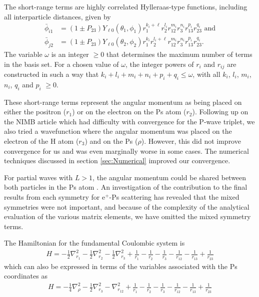 \documentclass[preprint,showpacs,preprintnumbers,amsmath,amssymb]{revtex4}
\begin{document}
The short-range terms are highly correlated Hylleraas-type functions, including all interparticle distances, given by
\begin{subequations}
\label{eq:PhiDef}
\begin{align}
\bar{\phi}_{i1} &= \left(1 \pm P_{23}\right) Y_{\ell 0}(\theta_1,\phi_1) r_1^{k_i + \ell} r_2^{l_i} r_{12}^{m_i} r_3^{n_i} r_{13}^{p_i} r_{23}^{q_i} \text{ and} \label{eq:PartialWavePhi1i}\\
\bar{\phi}_{j2} &= \left(1 \pm P_{23}\right) Y_{\ell 0}(\theta_2,\phi_2) r_1^{k_i} r_2^{l_i + \ell} r_{12}^{m_i} r_3^{n_i} r_{13}^{p_i} r_{23}^{q_i} \label{eq:PartialWavePhi2j}.
\end{align}
\end{subequations}
The variable $\omega$ is an integer $\geq 0$ that determines the maximum number of terms in the basis set.  For a chosen value of $\omega$, the integer powers of $r_i$ and $r_{ij}$ are constructed in such a way that $k_i + l_i + m_i + n_i + p_i + q_i \leq \omega$, with all $k_i$, $l_i$, $m_i$, $n_i$, $q_i$ and $p_i$ $\geq 0$.

These short-range terms represent the angular momentum as being placed on either the positron ($r_1$) or on the electron on the Ps atom ($r_2$).
Following up on the NIMB article \cite{VanReeth2004} which had difficulty with convergence for the P-wave triplet, we also tried a wavefunction where the angular momentum was placed on the electron of the H atom ($r_3$) and on the Ps ($\rho$). However, this did not improve convergence for us and was even marginally worse in some cases. The numerical techniques discussed in section \ref{sec:Numerical} improved our convergence.

For partial waves with $L>1$, the angular momentum could be shared between both particles in the Ps atom \cite{Schwartz1961a}. An investigation of the contribution to the final results from each symmetry for e$^+$-Ps scattering \cite{VanReeth1997} has revealed that the mixed symmetries were not important, and because of the complexity of the analytical evaluation of the various matrix elements, we have omitted the mixed symmetry terms.


The Hamiltonian for the fundamental Coulombic system is
\begin{align}
H = -\frac{1}{2} \nabla_{r_1}^2 - \frac{1}{2} \nabla_{r_2}^2 - \frac{1}{2} \nabla_{r_3}^2 + \frac {1}{r_1}-\frac {1}{r_2}-\frac {1}{r_3}-\frac {1}{r_{12}}-\frac {1}{r_{13}}+\frac {1}{r_{23}}
	\label{Hamiltonian1}
\end{align}
which can also be expressed in terms of the variables associated with the Ps coordinates as
\begin{align}
H = -\frac{1}{4} \nabla_{\rho}^2 - \frac{1}{2} \nabla_{r_3}^2 - \nabla_{r_{12}}^2 + \frac {1}{r_1}-\frac {1}{r_2}-\frac {1}{r_3}-\frac {1}{r_{12}}-\frac {1}{r_{13}}+\frac {1}{r_{23}}
	\label{Hamiltonian2}
\end{align}
\end{document}

